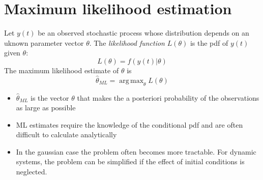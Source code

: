\documentclass{book}
\DeclareMathOperator*{\argmax}{arg\,max}
\theoremstyle{definition}
\theoremstyle{remark}
\theoremstyle{remark}
\begin{document}
\chapter{Maximum likelihood estimation}

Let $y(t)$ be an observed stochastic process whose distribution depends on an uknown parameter vector $\theta$. The \emph{likelihood function} $L(\theta)$ is the pdf of $y(t)$ given $\theta$: 
\[
    L(\theta)=f(y(t)|\theta)
\]
The maximum likelihood estimate of $\theta$ is 
\[
    \hat{\theta}_{ML}=\argmax_\theta L(\theta)
\]
\begin{itemize}
    \item $\hat{\theta}_{ML}$ is the vector $\theta$ that makes the a posteriori probability of the observations as large as possible 
    \item ML estimates require the knowledge of the conditional pdf and are often difficult to calculate analytically
    \item In the gaussian case the problem often becomes more tractable. For dynamic systems, the problem can be simplified if the effect of initial conditions is neglected.
\end{itemize}
\end{document}
